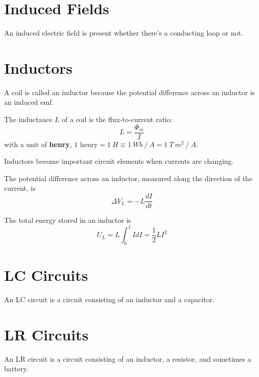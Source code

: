 \documentclass{article}
\begin{document}
\section*{Induced Fields}
An induced electric field is present whether there's a conducting loop or not.

\section*{Inductors}
A coil is called an inductor because the potential difference across an inductor is an induced emf.

The inductance $L$ of a coil is the flux-to-current ratio:
\[L=\frac{\Phi_m}{I}\] with a unit of \textbf{henry},
$1 \text{ henry} = 1\: H \equiv 1\: Wb\: /\: A = 1\: T\: m^2\: /\: A$.

\vspace{1em}
Inductors become important circuit elements when currents are changing.

\vspace{1em}
The potential difference across an inductor, measured along the direction of the current, is
\[\Delta V_L = -L\frac{dI}{dt}\]

The total energy stored in an inductor is
\[U_L = L\int_0^I I dI = \frac{1}{2}LI^2\]

\section*{LC Circuits}
An LC circuit is a circuit consisting of an inductor and a capacitor.

\section*{LR Circuits}
An LR circuit is a circuit consisting of an inductor, a resistor, and sometimes a battery.
\end{document}
